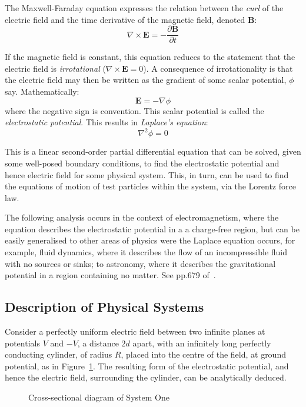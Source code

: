 \documentclass[11pt, a4paper]{article}
\newcommand{\be}{\begin{equation}}
\newcommand{\ee}{\end{equation}}
\begin{document}
The Maxwell-Faraday equation expresses the relation between the \emph{curl} of the
electric field and the time derivative of the magnetic field, denoted \textbf{B}:
%
\be
\nabla \times \bm{E} = - \frac{\partial \bm{B}}{\partial t}
\ee

If the magnetic field is constant, this equation reduces to the statement that
the electric field is \emph{irrotational} ($\nabla \times \bm{E}=0$). A
consequence of irrotationality is that the electric field may then be written as
the gradient of some scalar potential, $\phi$ say. Mathematically:
%
\be
\bm{E} = -\nabla \phi
\ee
%
where the negative sign is convention. This scalar potential is called the
\emph{electrostatic potential}. This results in \emph{Laplace's equation}:
%
\be
\nabla^2 \phi = 0
\ee

This is a linear second-order partial differential equation that can be solved, given
some well-posed boundary conditions, to find the electrostatic potential and hence
electric field for some physical system. This, in turn, can be used to find the
equations of motion of test particles within the system, via the Lorentz force law.

The following analysis occurs in the context of electromagnetism, where the equation
describes the electrostatic potential in a a charge-free region, but can be easily
generalised to other areas of physics were the Laplace equation occurs, for example,
fluid dynamics, where it describes the flow of an incompressible fluid with no sources
or sinks; to astronomy, where it describes the gravitational potential in a region
containing no matter. See pp.679 of~\cite{mm}.

\subsection{Description of Physical Systems}

Consider a perfectly uniform electric field between two infinite planes at potentials
$V$ and $-V$, a distance $2d$ apart, with an infinitely long perfectly conducting
cylinder, of radius $R$, placed into the centre of the field, at ground potential,
as in Figure~\ref{fig:sys one}. The resulting form of the electrostatic potential,
and hence the electric field, surrounding the cylinder, can be analytically deduced.

\begin{figure}[h!]
\begin{center}
\end{center}
\caption{Cross-sectional diagram of System One}
\label{fig:sys one}
\end{figure}
\end{document}
